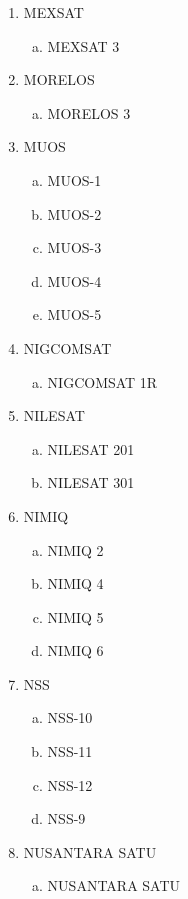 \begin{multicols}{2}
\begin{enumerate}
\begin{enumerate}[a.]
    \item MEV-2
  \end{enumerate}
  \item MEXSAT
  \begin{enumerate}[a.]
    \item MEXSAT 3
  \end{enumerate}
  \item MORELOS
  \begin{enumerate}[a.]
    \item MORELOS 3
  \end{enumerate}
  \item MUOS
  \begin{enumerate}[a.]
    \item MUOS-1
    \item MUOS-2
    \item MUOS-3
    \item MUOS-4
    \item MUOS-5
  \end{enumerate}
  \item NIGCOMSAT
  \begin{enumerate}[a.]
    \item NIGCOMSAT 1R
  \end{enumerate}
  \item NILESAT
  \begin{enumerate}[a.]
    \item NILESAT 201
    \item NILESAT 301
  \end{enumerate}
  \item NIMIQ
  \begin{enumerate}[a.]
    \item NIMIQ 2
    \item NIMIQ 4
    \item NIMIQ 5
    \item NIMIQ 6
  \end{enumerate}
  \item NSS
  \begin{enumerate}[a.]
    \item NSS-10
    \item NSS-11
    \item NSS-12
    \item NSS-9
  \end{enumerate}
  \item NUSANTARA SATU
  \begin{enumerate}[a.]
    \item NUSANTARA SATU
  \end{enumerate}

\end{enumerate}
\end{multicols}
